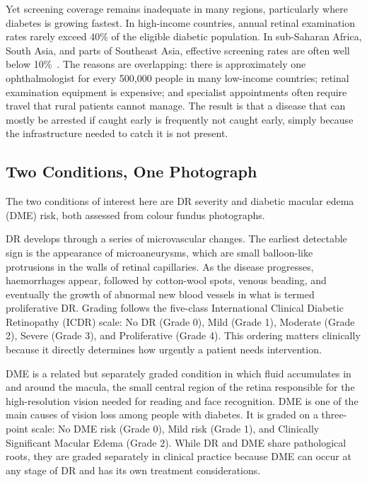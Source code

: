 \documentclass[12pt,a4paper]{article}
\begin{document}
Yet screening coverage remains inadequate in many regions, particularly where diabetes is growing fastest. In high-income countries, annual retinal examination rates rarely exceed 40\% of the eligible diabetic population. In sub-Saharan Africa, South Asia, and parts of Southeast Asia, effective screening rates are often well below 10\%~\cite{IDF2021}. The reasons are overlapping: there is approximately one ophthalmologist for every 500,000 people in many low-income countries; retinal examination equipment is expensive; and specialist appointments often require travel that rural patients cannot manage. The result is that a disease that can mostly be arrested if caught early is frequently not caught early, simply because the infrastructure needed to catch it is not present.

\subsection{Two Conditions, One Photograph}

The two conditions of interest here are DR severity and diabetic macular edema (DME) risk, both assessed from colour fundus photographs.

DR develops through a series of microvascular changes. The earliest detectable sign is the appearance of microaneurysms, which are small balloon-like protrusions in the walls of retinal capillaries. As the disease progresses, haemorrhages appear, followed by cotton-wool spots, venous beading, and eventually the growth of abnormal new blood vessels in what is termed proliferative DR. Grading follows the five-class International Clinical Diabetic Retinopathy (ICDR) scale: No DR (Grade 0), Mild (Grade 1), Moderate (Grade 2), Severe (Grade 3), and Proliferative (Grade 4). This ordering matters clinically because it directly determines how urgently a patient needs intervention.

DME is a related but separately graded condition in which fluid accumulates in and around the macula, the small central region of the retina responsible for the high-resolution vision needed for reading and face recognition. DME is one of the main causes of vision loss among people with diabetes. It is graded on a three-point scale: No DME risk (Grade 0), Mild risk (Grade 1), and Clinically Significant Macular Edema (Grade 2). While DR and DME share pathological roots, they are graded separately in clinical practice because DME can occur at any stage of DR and has its own treatment considerations.
\end{document}
